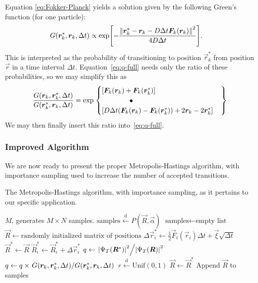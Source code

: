 \documentclass[twocolumn]{article}
\newcommand{\setfrom}{\overset{\mathrm{d}}{\leftarrow}}
\begin{document}
Equation \eqref{eq:Fokker-Planck} yields a solution given by
the following Green's function (for one particle):
\begin{align}
    G(\bm r_k^*, \bm r_k, \Delta t) &\propto 
    \exp[- \frac{\norm{\bm r_k^* - \bm r_k - D\Delta t \bm F_k(\bm r_k)}^2}{4D\Delta t} ].
\end{align}
This is interpreted as the probability of transitioning to position $\vec r_k^*$
from position $\vec r$ in a time interval $\Delta t$. Equation~\eqref{eq:q-full}
needs only the ratio of these probabilities, so we may simplify this as
\begin{align}
    \frac{G(\vec r_k, \vec r_k^*, \Delta t)}{G(\vec r_k^*, \vec r_k, \Delta t)} = 
    \exp\left.\begin{cases}
        \qty[\vec F_k(\vec r_k) + \vec F_k(\vec r_k^*)]\\
        \qqtext{}\qqtext{}\bullet\\
        \qty[D\Delta t \qty(\vec F_k(\vec r_k)-\vec F_k(\vec r_k^*)) + 2\vec r_k
        - 2\vec r_k^*]
    \end{cases}\right\}\label{eq:Greens-ratio}
\end{align}
We may then finally insert this ratio into~\eqref{eq:q-full}.



\subsubsection{Improved Algorithm}
We are now ready to present the proper Metropolis-Hastings algorithm, with
importance sampling used to increase the number of accepted transitions.

\begin{algorithm}[H]
    \caption{The Metropolis-Hastings algorithm, with importance sampling, as it
    pertains to our specific application.}
    \label{alg:metropolis-simple}
    \begin{algorithmic}[1]
        \REQUIRE $M$, generates $M\times N$ samples.
        \ENSURE $\text{samples} \setfrom P(\vec R, \vec\alpha)$
        \STATE $\text{samples} \leftarrow \text{empty list}$
        \STATE $\vec R \leftarrow \text{randomly initialized matrix of positions}$
                \STATE $\Delta\vec r_i^* \leftarrow \frac{1}{2}\vec
                F_i(\vec r_i)\Delta t + \vec \xi\sqrt{\Delta t}$
                \STATE $\vec R^*\leftarrow \vec R $
                \STATE $\vec R^*_i \leftarrow \vec R^{*}_i+ \Delta \vec r_i^*$ 
                \STATE $q \leftarrow \flatfrac{\abs{\Psi_T(\vec R^*)}^2}{\abs{\Psi_T(\vec R)}^2}$
                \STATE $q \leftarrow q \times \flatfrac{G(\vec r_k, \vec r_k^*,
                    \Delta t)}{G(\vec r_k^*, \vec r_k, \Delta t)}$
                \STATE $r \setfrom \text{Unif}(0, 1)$
                    \STATE $\vec R \leftarrow \vec R^*$
                \ENDIF
                \STATE Append $\vec R$ to samples
            \ENDFOR
        \ENDFOR
    \end{algorithmic}
\end{algorithm}



\printbibliography
\end{document}
